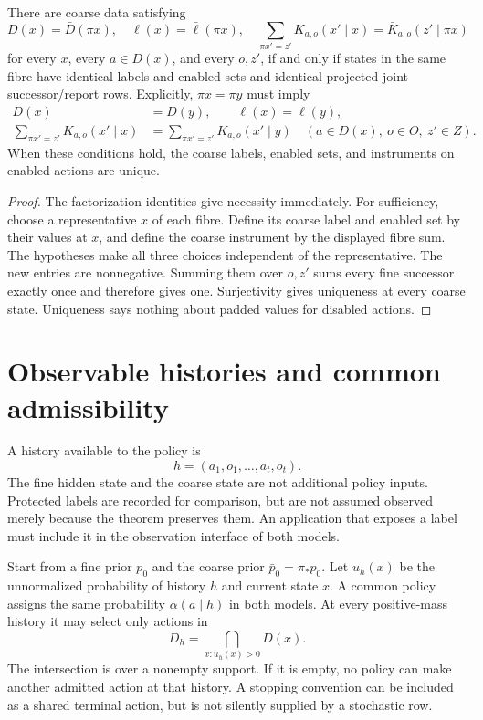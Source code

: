 \begin{Coretheorem}\label{Core:r:joint-quotient}
There are coarse data satisfying
\[
 D(x)=\bar D(\pi x),\quad \ell(x)=\bar\ell(\pi x),\quad
 \sum_{\pi x'=z'}K_{a,o}(x'\mid x)=\bar K_{a,o}(z'\mid\pi x)
\]
for every $x$, every $a\in D(x)$, and every $o,z'$, if and only if states in the same fibre have identical labels and enabled sets and identical projected joint successor/report rows. Explicitly, $\pi x=\pi y$ must imply
\begin{align}
 D(x)&=D(y),\qquad \ell(x)=\ell(y),\label{Core:eq:fibre-legal}\\
 \sum_{\pi x'=z'}K_{a,o}(x'\mid x)
 &=\sum_{\pi x'=z'}K_{a,o}(x'\mid y)
 \quad(a\in D(x),\ o\in O,\ z'\in Z).\label{Core:eq:fibre-joint}
\end{align}
When these conditions hold, the coarse labels, enabled sets, and instruments on enabled actions are unique.
\end{Coretheorem}
\begin{proof}
The factorization identities give necessity immediately. For sufficiency, choose a representative $x$ of each fibre. Define its coarse label and enabled set by their values at $x$, and define the coarse instrument by the displayed fibre sum. The hypotheses make all three choices independent of the representative. The new entries are nonnegative. Summing them over $o,z'$ sums every fine successor exactly once and therefore gives one. Surjectivity gives uniqueness at every coarse state. Uniqueness says nothing about padded values for disabled actions.
\end{proof}

\section{Observable histories and common admissibility}
A history available to the policy is
\[
 h=(a_1,o_1,\ldots,a_t,o_t).
\]
The fine hidden state and the coarse state are not additional policy inputs. Protected labels are recorded for comparison, but are not assumed observed merely because the theorem preserves them. An application that exposes a label must include it in the observation interface of both models.

Start from a fine prior $p_0$ and the coarse prior $\bar p_0=\pi_*p_0$. Let $u_h(x)$ be the unnormalized probability of history $h$ and current state $x$. A common policy assigns the same probability $\alpha(a\mid h)$ in both models. At every positive-mass history it may select only actions in
\[
 D_h=\bigcap_{x:u_h(x)>0}D(x).
\]
The intersection is over a nonempty support. If it is empty, no policy can make another admitted action at that history. A stopping convention can be included as a shared terminal action, but is not silently supplied by a stochastic row.

